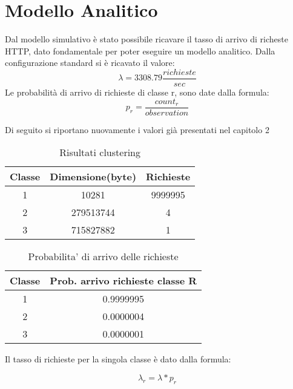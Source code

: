 \chapter{Modello Analitico}
Dal modello simulativo è stato possibile ricavare il tasso di arrivo di richeste HTTP, dato fondamentale per poter eseguire un modello analitico. Dalla configurazione standard si è ricavato il valore: 
\begin{equation}
\lambda =  3308.79 \frac{richieste}{sec}
\end{equation}
Le probabilità di arrivo di richieste di classe r, sono date dalla formula:
\begin{equation}
p_{r} = \frac{count_{r}}{observation}
\end{equation}
\begin{flushleft}
Di seguito si riportano nuovamente i valori già presentati nel capitolo 2
\end{flushleft}
\begin{table}[H]
\begin{center}
\begin{tabular}{||c|c|c||}
\hline
Classe	&Dimensione(byte)		&Richieste \\ 
\hline\hline
1 &10281 &9999995\\ \hline
2 &279513744 &4 \\ \hline
3 &715827882 &1 \\ \hline
\end{tabular}
\end{center}
\caption{Risultati clustering}
\label{risclustering}
\end{table}
\begin{table}[H]
\begin{center}
\begin{tabular}{||c|c||}
\hline
Classe		&Prob. arrivo richieste classe R	\\
\hline
\hline
1		&0.9999995	\\
\hline
2		&0.0000004\\
\hline
3		&0.0000001\\
\hline
\end{tabular}
\end{center}
\caption{Probabilita' di arrivo delle richieste}
\label{test_2}
\end{table}
\begin{flushleft}
Il tasso di richieste per la singola classe è dato dalla formula:
\end{flushleft}
\begin{equation}
\lambda_{r} = \lambda*p_{r}
\end{equation}
